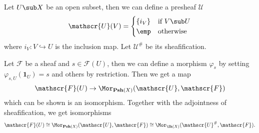 \begin{example}\label{sheaf by open subset}
Let $U\sub X$ be an open subset, then we can define a presheaf $\mathscr{U}$
\[\mathscr{U}(V)=\begin{cases}
\{i_V\}&\text{if }V\sub U\\
\emp&\text{otherwise}
\end{cases}\]
where $i_V:V\hookrightarrow U$ is the inclusion map. Let $\mathscr{U}^{\#}$ be its sheafification.\par
Let $\mathscr{F}$ be a sheaf and $s\in\mathscr{F}(U)$, then we can define a morphism $\varphi_s$ by setting $\varphi_{s,U}(\mathbf{1}_U)=s$ and others by restriction. Then we get a map
\[\mathscr{F}(U)\to\Mor_{\mathbf{Psh}(X)}(\mathscr{U},\mathscr{F})\]
which can be shown is an isomorphism. Together with the adjointness of sheafification, we get isomorphisms
\[\mathscr{F}(U)\cong\Mor_{\mathbf{Psh}(X)}(\mathscr{U},\mathscr{F})\cong\Mor_{\Sh(X)}(\mathscr{U}^{\#},\mathscr{F}).\]
\end{example}

